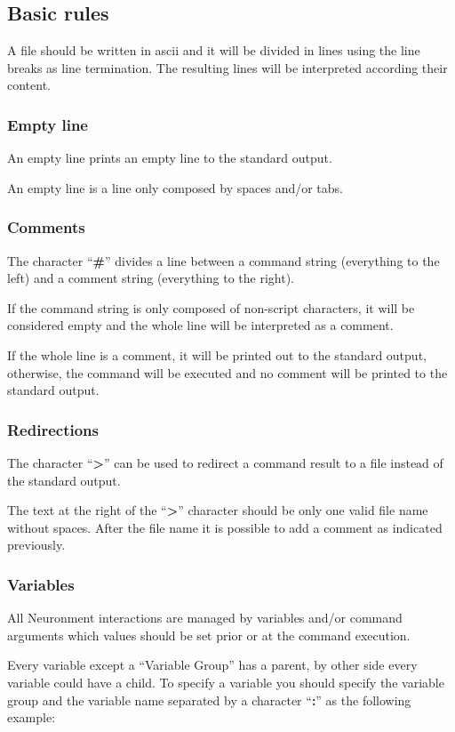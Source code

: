 \subsection{Basic rules}
A  file should be written in ascii and it will be divided in lines using the line breaks as line termination. The resulting lines will be interpreted according their content.

\subsubsection{Empty line}
An empty line prints an empty line to the standard output.

An empty line is a line only composed by spaces and/or tabs.

\subsubsection{Comments}
The character ``\textbf{\#}'' divides a line between a command string (everything to the left) and a comment string (everything to the right).

If the command string is only composed of non-script characters, it will be considered empty and the whole line will be interpreted as a comment.

If the whole line is a comment, it will be printed out to the standard output, otherwise, the command will be executed and no comment will be printed to the standard output.

\subsubsection{Redirections}
The character ``\textbf{>}'' can be used to redirect a command result to a file instead of the standard output.

The text at the right of the ``\textbf{>}'' character should be only one valid file name without spaces. After the file name it is possible to add a comment as indicated previously.

\subsubsection{Variables}
All Neuronment interactions are managed by variables and/or command arguments which values should be set prior or at the command execution.

Every variable except a ``Variable Group'' has a parent, by other side every variable could have a child. To specify a variable you should specify the variable group and the variable name separated by a character ``\textbf{:}'' as the following example:

